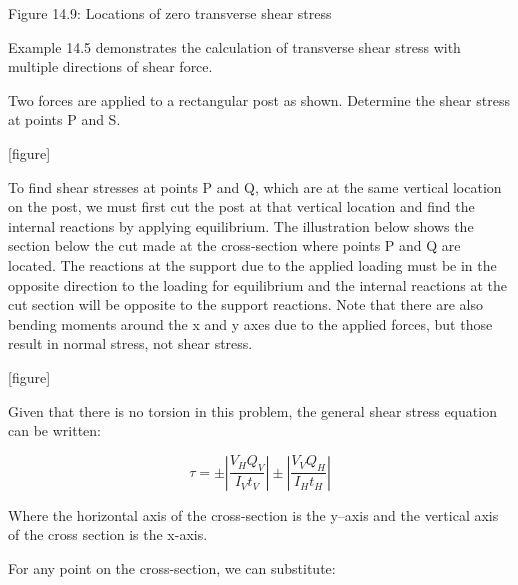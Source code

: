\documentclass[
  letterpaper,
  DIV=11,
  numbers=noendperiod]{scrreprt}
\theoremstyle{definition}
\theoremstyle{remark}
\begin{document}
Figure 14.9: Locations of zero transverse shear stress

Example 14.5 demonstrates the calculation of transverse shear stress
with multiple directions of shear force.

\begin{tcolorbox}[enhanced jigsaw, leftrule=.75mm, colbacktitle=quarto-callout-tip-color!10!white, breakable, opacityback=0, colback=white, titlerule=0mm, toprule=.15mm, colframe=quarto-callout-tip-color-frame, coltitle=black, title={Example 14.5}, toptitle=1mm, bottomrule=.15mm, rightrule=.15mm, left=2mm, arc=.35mm, opacitybacktitle=0.6, bottomtitle=1mm]

Two forces are applied to a rectangular post as shown. Determine the
shear stress at points P and S.

{[}figure{]}

\begin{tcolorbox}[enhanced jigsaw, leftrule=.75mm, colbacktitle=quarto-callout-tip-color!10!white, breakable, opacityback=0, colback=white, titlerule=0mm, toprule=.15mm, colframe=quarto-callout-tip-color-frame, coltitle=black, title={Solution}, toptitle=1mm, bottomrule=.15mm, rightrule=.15mm, left=2mm, arc=.35mm, opacitybacktitle=0.6, bottomtitle=1mm]

To find shear stresses at points P and Q, which are at the same vertical
location on the post, we must first cut the post at that vertical
location and find the internal reactions by applying equilibrium. The
illustration below shows the section below the cut made at the
cross-section where points P and Q are located. The reactions at the
support due to the applied loading must be in the opposite direction to
the loading for equilibrium and the internal reactions at the cut
section will be opposite to the support reactions. Note that there are
also bending moments around the x and y axes due to the applied forces,
but those result in normal stress, not shear stress.

{[}figure{]}

Given that there is no torsion in this problem, the general shear stress
equation can be written:

\[
\tau= \pm\left|\frac{V_H Q_V}{I_V t_V}\right| \pm\left|\frac{V_V Q_H}{I_H t_H}\right|
\]

Where the horizontal axis of the cross-section is the y--axis and the
vertical axis of the cross section is the x-axis.

For any point on the cross-section, we can substitute:


\end{tcolorbox}
\end{tcolorbox}
\end{document}
